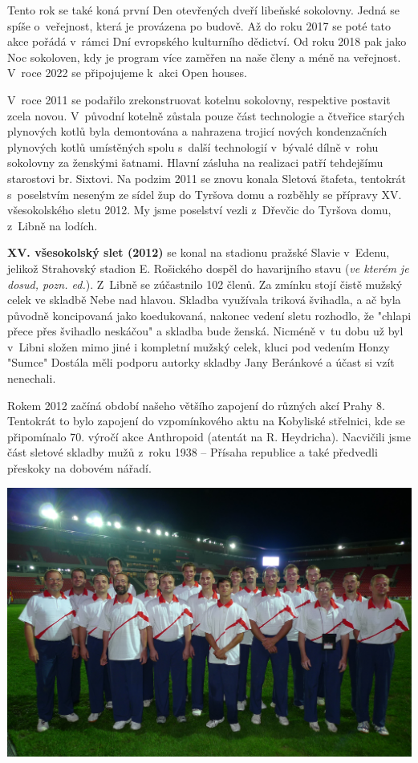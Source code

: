 \documentclass[a5paper, 11pt, twoside]{article}
\begin{document}
Tento rok se také koná první Den otevřených dveří libeňské sokolovny.
Jedná se spíše o~veřejnost, která je provázena po budově. Až do roku
2017 se poté tato akce pořádá v~rámci Dní evropského kulturního
dědictví. Od roku 2018 pak jako Noc sokoloven, kdy je program více
zaměřen na naše členy a méně na veřejnost. V~roce 2022 se připojujeme
k~akci Open houses.

V~roce 2011 se podařilo zrekonstruovat kotelnu sokolovny, respektive
postavit zcela novou. V~původní kotelně zůstala pouze část technologie a
čtveřice starých plynových kotlů byla demontována a nahrazena trojicí
nových kondenzačních plynových kotlů umístěných spolu s~další
technologií v~bývalé dílně v~rohu sokolovny za ženskými šatnami. Hlavní
zásluha na realizaci patří tehdejšímu starostovi br. Sixtovi. Na podzim
2011 se znovu konala Sletová štafeta, tentokrát s~poselstvím neseným ze
sídel žup do Tyršova domu a rozběhly se přípravy XV. všesokolského sletu
2012. My jsme poselství vezli z~Dřevčic do Tyršova domu, z~Libně na
lodích.

\textbf{XV. všesokolský slet (2012)} se konal na stadionu pražské Slavie
v~Edenu, jelikož Strahovský stadion E. Rošického dospěl do havarijního
stavu (\textit{ve kterém je dosud, pozn. ed.}). Z~Libně se zúčastnilo 102
členů. Za zmínku stojí čistě mužský celek ve skladbě Nebe nad hlavou.
Skladba využívala triková švihadla, a ač byla původně koncipovaná jako
koedukovaná, nakonec vedení sletu rozhodlo, že "chlapi přece přes
švihadlo neskáčou" a skladba bude ženská. Nicméně v~tu dobu už byl
v~Libni složen mimo jiné i kompletní mužský celek, kluci pod vedením Honzy
"Sumce" Dostála měli podporu autorky skladby Jany Beránkové a účast si
vzít nenechali.

Rokem 2012 začíná období našeho většího zapojení do různých akcí Prahy
8. Tentokrát to bylo zapojení do vzpomínkového aktu na Kobyliské
střelnici, kde se připomínalo 70. výročí akce Anthropoid (atentát na R.
Heydricha). Nacvičili jsme část sletové skladby mužů z~roku 1938 --
Přísaha republice a také předvedli přeskoky na dobovém nářadí.

 \includegraphics[width=\textwidth]{img/61_muzi_slet_12.JPG}
\end{document}
